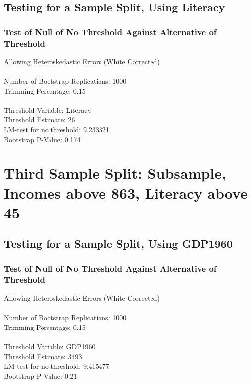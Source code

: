 \subsection{Testing for a Sample Split, Using Literacy} 
\subsubsection*{Test of Null of No Threshold Against Alternative of Threshold} 
Allowing Heteroskedastic Errors (White Corrected) \\\\
Number of Bootstrap Replications:  1000 \\
Trimming Percentage:               0.15 \\\\
Threshold Variable:                 Literacy \\
Threshold Estimate:                26 \\
LM-test for no threshold:          9.233321 \\
Bootstrap P-Value:                 0.174 \\

\section{Third Sample Split: Subsample, Incomes above 863, Literacy above 45}

\subsection{Testing for a Sample Split, Using GDP1960} 
\subsubsection*{Test of Null of No Threshold Against Alternative of Threshold} 
Allowing Heteroskedastic Errors (White Corrected) \\\\
Number of Bootstrap Replications:  1000 \\
Trimming Percentage:               0.15 \\\\
Threshold Variable:                 GDP1960 \\
Threshold Estimate:                3493 \\
LM-test for no threshold:          9.415477 \\
Bootstrap P-Value:                 0.21 \\

